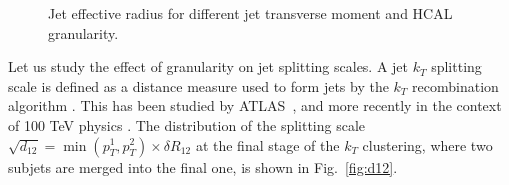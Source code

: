 \begin{figure}
\begin{center}
{   }
\end{center}
\caption{Jet effective radius for different jet transverse moment and HCAL granularity.}
\label{fig:eff_rad}
\end{figure}


Let us study the effect of granularity on jet splitting scales.
A jet $k_T$ splitting scale \cite{Butterworth:2002tt} is defined as a distance measure
used to form jets by the $k_T$ recombination
algorithm \cite{Catani1993187,Ellis:1993tq}.
This has been studied by ATLAS~\cite{ATLAS:2012am}, and more recently in the context of 100 TeV physics \cite{Auerbach:2014xua}.
The distribution of the splitting scale $\sqrt{d_{12}}=\min(p_T^1,p_T^2) \times \delta R_{12}$ \cite{ATLAS:2012am} at the final stage of the $k_T$ clustering, where two subjets are merged into the final one,
is shown in Fig.~\ref{fig:d12}.

